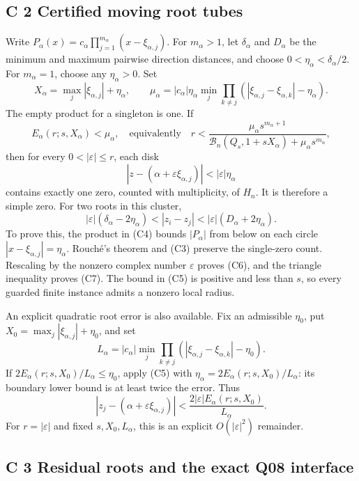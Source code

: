 \documentclass[
  11pt,
]{article}
\begin{document}
\subsection{C 2 Certified moving root tubes}

Write \(P_\alpha(x)=c_\alpha\prod_{j=1}^{m_\alpha}(x-\xi_{\alpha,j})\).
For \(m_\alpha>1\), let \(\delta_\alpha\) and \(D_\alpha\) be the
minimum and maximum pairwise direction distances, and choose
\(0<\eta_\alpha<\delta_\alpha/2\). For \(m_\alpha=1\), choose any
\(\eta_\alpha>0\). Set
\[
X_\alpha=\max_j|\xi_{\alpha,j}|+\eta_\alpha,\qquad
\mu_\alpha=|c_\alpha|\eta_\alpha
 \min_j\prod_{k\ne j}(|\xi_{\alpha,j}-\xi_{\alpha,k}|-\eta_\alpha).
\tag{C4}
\]
The empty product for a singleton is one. If
\[
E_\alpha(r;s,X_\alpha)<\mu_\alpha,
\quad\text{equivalently}\quad
r<\frac{\mu_\alpha s^{m_\alpha+1}}
 {\mathcal B_n(Q_s,1+sX_\alpha)+\mu_\alpha s^{m_\alpha}},
\tag{C5}
\]
then for every \(0<|\varepsilon|\leq r\), each disk
\[
|z-(\alpha+\varepsilon\xi_{\alpha,j})|<|\varepsilon|\eta_\alpha
\tag{C6}
\]
contains exactly one zero, counted with multiplicity, of \(H_n\).
It is therefore a simple zero. For two roots in this cluster,
\[
|\varepsilon|(\delta_\alpha-2\eta_\alpha)
< |z_i-z_j|
< |\varepsilon|(D_\alpha+2\eta_\alpha). \tag{C7}
\]
To prove this, the product in (C4) bounds \(|P_\alpha|\) from below
on each circle \(|x-\xi_{\alpha,j}|=\eta_\alpha\). Rouch\'e's theorem
and (C3) preserve the single-zero count. Rescaling by the nonzero
complex number \(\varepsilon\) proves (C6), and the triangle inequality
proves (C7). The bound in (C5) is positive and less than \(s\), so every
guarded finite instance admits a nonzero local radius.

An explicit quadratic root error is also available. Fix an admissible
\(\eta_0\), put \(X_0=\max_j|\xi_{\alpha,j}|+\eta_0\), and set
\[
L_\alpha=|c_\alpha|\min_j\prod_{k\ne j}
 (|\xi_{\alpha,j}-\xi_{\alpha,k}|-\eta_0).
\]
If \(2E_\alpha(r;s,X_0)/L_\alpha\leq\eta_0\), apply (C5) with
\(\eta_\alpha=2E_\alpha(r;s,X_0)/L_\alpha\): its boundary lower bound
is at least twice the error. Thus
\[
|z_j-(\alpha+\varepsilon\xi_{\alpha,j})|
<\frac{2|\varepsilon|E_\alpha(r;s,X_0)}{L_\alpha}. \tag{C8}
\]
For \(r=|\varepsilon|\) and fixed \(s,X_0,L_\alpha\), this is an
explicit \(O(|\varepsilon|^2)\) remainder.

\subsection{C 3 Residual roots and the exact Q08 interface}
\end{document}

